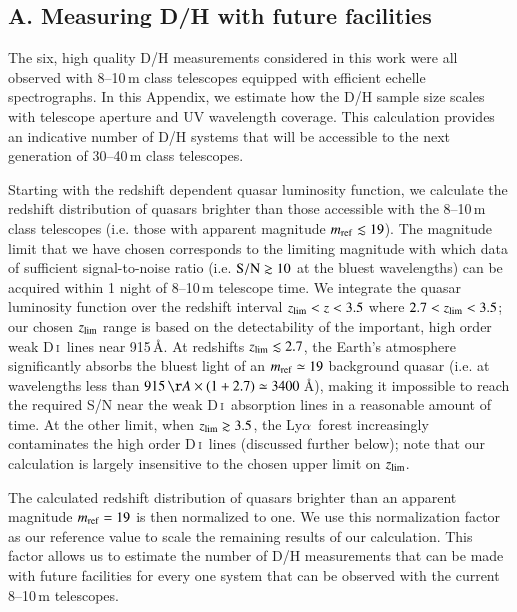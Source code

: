 \documentclass[12pt,preprint,useAMS,usenatbib]{emulateapj}
\newcommand{\DI}{\textrm{D}\,\textsc{i}}
\newcommand{\Lya}{Ly$\alpha$}
\begin{document}
\begin{appendix}

\section{A. Measuring D/H with future facilities}
\label{app:future}

The six, high quality D/H measurements considered in this
work were all observed with 8--10\,m class telescopes equipped
with efficient echelle spectrographs. In this Appendix, we
estimate how the D/H sample size scales with telescope
aperture and UV wavelength coverage. This calculation
provides an indicative number of D/H systems that
will be accessible to the next generation of 30--40\,m
class telescopes.

Starting with the \citet{Ros13} redshift dependent quasar
luminosity function, we calculate the redshift distribution of
quasars brighter than those accessible with the 8--10\,m class
telescopes (i.e. those with apparent magnitude $m_{\rm ref}\lesssim19$).
The magnitude limit that we have chosen corresponds to the limiting
magnitude with which data of sufficient signal-to-noise ratio
(i.e. ${\rm S/N}\gtrsim10$ at the bluest wavelengths) can be
acquired within 1 night of 8--10\,m telescope time. We integrate the
quasar luminosity function over the redshift interval
$z_{\rm lim} < z < 3.5$ where $2.7 < z_{\rm lim} < 3.5$;
our chosen $z_{\rm lim}$ range is based on the detectability
of the important, high order weak \DI\ lines near 915\,\AA.
At redshifts $z_{\rm lim}\lesssim2.7$, the Earth's atmosphere
significantly absorbs the bluest light of an $m_{\rm ref}\simeq19$
background quasar (i.e. at wavelengths less than
$915\,\AA\times(1+2.7)\simeq3400$\,\AA), making it
impossible to reach the required S/N near the weak \DI\
absorption lines in a reasonable amount of time.
At the other limit, when $z_{\rm lim}\gtrsim3.5$,
the \Lya\ forest increasingly contaminates the high
order \DI\ lines (discussed further below); note that
our calculation is largely insensitive to the chosen
upper limit on $z_{\rm lim}$.

The calculated redshift distribution of quasars brighter
than an apparent magnitude $m_{\rm ref}=19$ is then
normalized to one. We use this normalization factor as
our reference value to scale the remaining results of our
calculation. This factor allows us to estimate the number
of D/H measurements that can be made with future
facilities for every one system that can be observed
with the current 8--10\,m telescopes.


\end{appendix}
\end{document}
